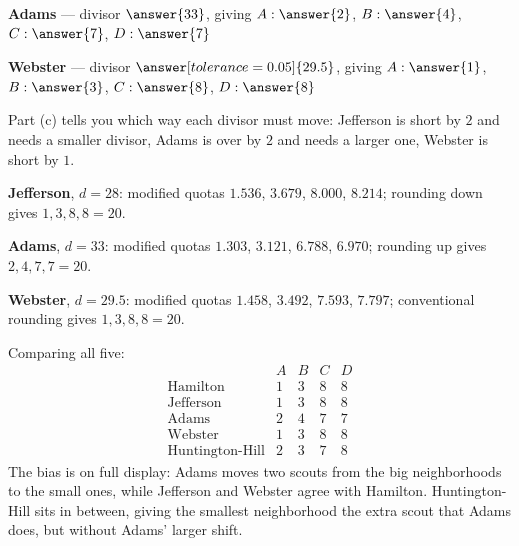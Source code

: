\documentclass[12pt]{ximera}
\begin{document}
\begin{problem}
\begin{prompt}
\smallskip
\textbf{Adams} --- divisor $\answer{33}$, giving $A: \answer{2}$, $B: \answer{4}$,
$C: \answer{7}$, $D: \answer{7}$

\smallskip
\textbf{Webster} --- divisor $\answer[tolerance=0.05]{29.5}$, giving $A: \answer{1}$,
$B: \answer{3}$, $C: \answer{8}$, $D: \answer{8}$

\begin{hint}
Part (c) tells you which way each divisor must move: Jefferson is short by $2$ and needs
a smaller divisor, Adams is over by $2$ and needs a larger one, Webster is short by $1$.
\end{hint}

\begin{feedback}
\textbf{Jefferson}, $d = 28$: modified quotas $1.536$, $3.679$, $8.000$, $8.214$;
rounding down gives $1, 3, 8, 8 = 20$. \checkmark

\textbf{Adams}, $d = 33$: modified quotas $1.303$, $3.121$, $6.788$, $6.970$; rounding up
gives $2, 4, 7, 7 = 20$. \checkmark

\textbf{Webster}, $d = 29.5$: modified quotas $1.458$, $3.492$, $7.593$, $7.797$;
conventional rounding gives $1, 3, 8, 8 = 20$. \checkmark

Comparing all five:
\[
\begin{array}{lcccc}
 & A & B & C & D\\
\text{Hamilton} & 1 & 3 & 8 & 8\\
\text{Jefferson} & 1 & 3 & 8 & 8\\
\text{Adams} & 2 & 4 & 7 & 7\\
\text{Webster} & 1 & 3 & 8 & 8\\
\text{Huntington-Hill} & 2 & 3 & 7 & 8
\end{array}
\]
The bias is on full display: Adams moves two scouts from the big neighborhoods to the
small ones, while Jefferson and Webster agree with Hamilton. Huntington-Hill sits in
between, giving the smallest neighborhood the extra scout that Adams does, but without
Adams' larger shift.
\end{feedback}
\end{prompt}
\end{problem}
\end{document}
